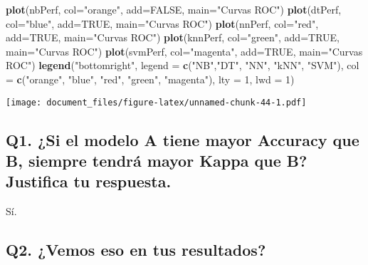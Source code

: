 \documentclass[]{article}
\newenvironment{Shaded}{\begin{snugshade}}{\end{snugshade}}
\newcommand{\DataTypeTok}[1]{\textcolor[rgb]{0.13,0.29,0.53}{#1}}
\newcommand{\DecValTok}[1]{\textcolor[rgb]{0.00,0.00,0.81}{#1}}
\newcommand{\KeywordTok}[1]{\textcolor[rgb]{0.13,0.29,0.53}{\textbf{#1}}}
\newcommand{\NormalTok}[1]{#1}
\newcommand{\OtherTok}[1]{\textcolor[rgb]{0.56,0.35,0.01}{#1}}
\newcommand{\StringTok}[1]{\textcolor[rgb]{0.31,0.60,0.02}{#1}}
\begin{document}
\begin{Shaded}
\begin{Highlighting}[]
\KeywordTok{plot}\NormalTok{(nbPerf, }\DataTypeTok{col=}\StringTok{"orange"}\NormalTok{, }\DataTypeTok{add=}\OtherTok{FALSE}\NormalTok{, }\DataTypeTok{main=}\StringTok{"Curvas ROC"}\NormalTok{)}
\KeywordTok{plot}\NormalTok{(dtPerf, }\DataTypeTok{col=}\StringTok{"blue"}\NormalTok{, }\DataTypeTok{add=}\OtherTok{TRUE}\NormalTok{, }\DataTypeTok{main=}\StringTok{"Curvas ROC"}\NormalTok{)}
\KeywordTok{plot}\NormalTok{(nnPerf, }\DataTypeTok{col=}\StringTok{"red"}\NormalTok{, }\DataTypeTok{add=}\OtherTok{TRUE}\NormalTok{, }\DataTypeTok{main=}\StringTok{"Curvas ROC"}\NormalTok{)}
\KeywordTok{plot}\NormalTok{(knnPerf, }\DataTypeTok{col=}\StringTok{"green"}\NormalTok{, }\DataTypeTok{add=}\OtherTok{TRUE}\NormalTok{, }\DataTypeTok{main=}\StringTok{"Curvas ROC"}\NormalTok{)}
\KeywordTok{plot}\NormalTok{(svmPerf, }\DataTypeTok{col=}\StringTok{"magenta"}\NormalTok{, }\DataTypeTok{add=}\OtherTok{TRUE}\NormalTok{, }\DataTypeTok{main=}\StringTok{"Curvas ROC"}\NormalTok{)}
\KeywordTok{legend}\NormalTok{(}\StringTok{"bottomright"}\NormalTok{, }
       \DataTypeTok{legend =} \KeywordTok{c}\NormalTok{(}\StringTok{"NB"}\NormalTok{,}\StringTok{"DT"}\NormalTok{, }\StringTok{"NN"}\NormalTok{, }\StringTok{"kNN"}\NormalTok{, }\StringTok{"SVM"}\NormalTok{), }
       \DataTypeTok{col =} \KeywordTok{c}\NormalTok{(}\StringTok{"orange"}\NormalTok{, }\StringTok{"blue"}\NormalTok{, }\StringTok{"red"}\NormalTok{, }\StringTok{"green"}\NormalTok{, }\StringTok{"magenta"}\NormalTok{), }
       \DataTypeTok{lty =} \DecValTok{1}\NormalTok{, }\DataTypeTok{lwd =} \DecValTok{1}\NormalTok{)}
\end{Highlighting}
\end{Shaded}

\texttt{[image: document\_files/figure-latex/unnamed-chunk-44-1.pdf]}

\hypertarget{question-1}{%
	\subsection{Q1. ¿Si el modelo A tiene mayor Accuracy que B, siempre tendrá mayor Kappa que B? Justifica tu respuesta.}\label{question-1}}

Sí.

\hypertarget{question-2}{%
	\subsection{Q2. ¿Vemos eso en tus resultados?}\label{question-2}}
\end{document}
